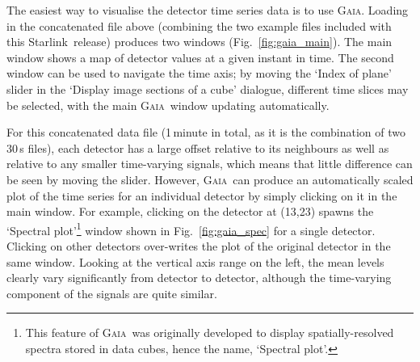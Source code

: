 \documentclass[twoside,11pt]{article}
\newcommand{\htmladdnormallink}[2]{#1}
\newcommand{\xref}[3]{#1}
\renewcommand{\_}{\texttt{\symbol{95}}}
\newcommand{\starlink}{\htmladdnormallink{Starlink}{http://starlink.jach.hawaii.edu}}
\newcommand{\gaia}{\xref{\textsc{Gaia}}{sun214}{}}
\begin{document}
The easiest way to visualise the detector time series data is to use
\gaia. Loading in the concatenated file above (combining the two
example files included with this \starlink\ release) produces two
windows (Fig.~\ref{fig:gaia_main}). The main window shows a map of
detector values at a given instant in time. The second window can be
used to navigate the time axis; by moving the `Index of plane' slider
in the `Display image sections of a cube' dialogue, different time
slices may be selected, with the main \gaia\ window updating
automatically.

For this concatenated data file (1\,minute in total, as it is the
combination of two 30\,s files), each detector has a large offset
relative to its neighbours as well as relative to any smaller
time-varying signals, which means that little difference can be seen
by moving the slider. However, \gaia\ can produce an automatically
scaled plot of the time series for an individual detector by simply
clicking on it in the main window. For example, clicking on the
detector at (13,23) spawns the `Spectral plot'\footnote{This feature
  of \gaia\ was originally developed to display spatially-resolved
  spectra stored in data cubes, hence the name, `Spectral plot'.}
window shown in Fig.~\ref{fig:gaia_spec} for a single
detector. Clicking on other detectors over-writes the plot of the
original detector in the same window. Looking at the vertical axis
range on the left, the mean levels clearly vary significantly from
detector to detector, although the time-varying component of the
signals are quite similar.
\end{document}
